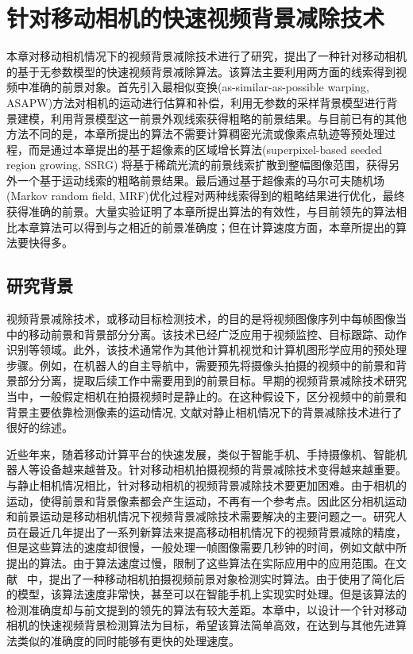\chapter{针对移动相机的快速视频背景减除技术}
 \label{ch4:FMCBS}
 本章对移动相机情况下的视频背景减除技术进行了研究，提出了一种针对移动相机的基于无参数模型的快速视频背景减除算法。该算法主要利用两方面的线索得到视频中准确的前景对象。首先引入最相似变换(as-similar-as-possible warping, ASAPW)方法对相机的运动进行估算和补偿，利用无参数的采样背景模型进行背景建模，利用背景模型这一前景外观线索获得粗略的前景结果。与目前已有的其他方法不同的是，本章所提出的算法不需要计算稠密光流或像素点轨迹等预处理过程，而是通过本章提出的基于超像素的区域增长算法(superpixel-based seeded region growing, SSRG) 将基于稀疏光流的前景线索扩散到整幅图像范围，获得另外一个基于运动线索的粗略前景结果。最后通过基于超像素的马尔可夫随机场(Markov random field, MRF)优化过程对两种线索得到的粗略结果进行优化，最终获得准确的前景。大量实验证明了本章所提出算法的有效性，与目前领先的算法相比本章算法可以得到与之相近的前景准确度；但在计算速度方面，本章所提出的算法要快得多。

 \section{研究背景}
 \label{ch4:sec:background}
视频背景减除技术，或移动目标检测技术，的目的是将视频图像序列中每帧图像当中的移动前景和背景部分分离。该技术已经广泛应用于视频监控、目标跟踪、动作识别等领域。此外，该技术通常作为其他计算机视觉和计算机图形学应用的预处理步骤。例如，在机器人的自主导航中，需要预先将摄像头拍摄的视频中的前景和背景部分分离，提取后续工作中需要用到的前景目标。早期的视频背景减除技术研究当中，一般假定相机在拍摄视频时是静止的。在这种假设下，区分视频中的前景和背景主要依靠检测像素的运动情况\cite{GMMPAMI,Barnich2011ViBe,pbas,vibe,subsenseTIP}, 文献对静止相机情况下的背景减除技术进行了很好的综述。\par

近些年来，随着移动计算平台的快速发展，类似于智能手机、手持摄像机、智能机器人等设备越来越普及。针对移动相机拍摄视频的背景减除技术变得越来越重要。与静止相机情况相比，针对移动相机的视频背景减除技术要更加困难。由于相机的运动，使得前景和背景像素都会产生运动，不再有一个参考点。因此区分相机运动和前景运动是移动相机情况下视频背景减除技术需要解决的主要问题之一。研究人员在最近几年提出了一系列新算法来提高移动相机情况下的视频背景减除的精度\cite{iccv2009,kwak2011Generalized,Cui2012,Multitransform,gbsuperpixel,SubspaceTracking}，但是这些算法的速度却很慢，一般处理一帧图像需要几秒钟的时间，例如文献中所提出的算法。由于算法速度过慢，限制了这些算法在实际应用中的应用范围。在文献 ~中，提出了一种移动相机拍摄视频前景对象检测实时算法。由于使用了简化后的模型，该算法速度非常快，甚至可以在智能手机上实现实时处理。但是该算法的检测准确度却与前文提到的领先的算法有较大差距。本章中，以设计一个针对移动相机的快速视频背景检测算法为目标，希望该算法简单高效，在达到与其他先进算法类似的准确度的同时能够有更快的处理速度。\par

